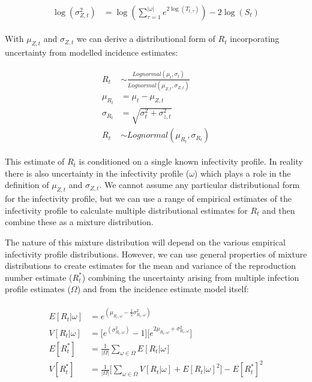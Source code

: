 \documentclass[10pt,letterpaper]{article}
\begin{document}
\begin{eqnarray}
\begin{aligned}
\log(\sigma_{Z,t}^2) &= \log(
	    \sum_{\tau=1}^{|\omega|} {
  	      e^{
  	        2 \log(T_{t,\tau})
  	      }
	    }) - 2 \log(S_{t})
\end{aligned}
\end{eqnarray}


With $\mu_{Z,t}$ and $\sigma_{Z,t}$ we can derive a distributional form of $R_t$ incorporating uncertainty from modelled incidence estimates:

\begin{eqnarray}
\label{eq:final}
\begin{aligned}
R_t &\sim \frac{Lognormal(\mu_t,\sigma_t)}
{Lognormal( \mu_{Z,t}, \sigma_{Z,t})} \\
\mu_{R_t} &= \mu_t - \mu_{Z,t} \\
\sigma_{R_t} &= \sqrt{\sigma_t^2+\sigma_{z,t}^2} \\
R_t &\sim Lognormal(\mu_{R_t}, \sigma_{R_t})
\end{aligned}
\end{eqnarray}

This estimate of $R_t$ is conditioned on a single known infectivity profile. In reality there is also uncertainty in the infectivity profile ($\omega$) which plays a role in the definition of $\mu_{Z,t}$ and $\sigma_{Z,t}$. We cannot assume any particular distributional form for the infectivity profile, but we can use a range of empirical estimates of the infectivity profile to calculate multiple distributional estimates for $R_t$ and then combine these as a mixture distribution.

The nature of this mixture distribution will depend on the various empirical infectivity profile distributions. However, we can use general properties of mixture distributions to create estimates for the mean and variance of the reproduction number estimate ($R_t^*$) combining the uncertainty arising from multiple infection profile estimates ($\Omega$) and from the incidence estimate model itself:

\begin{eqnarray}
\label{eq:final_2}
\begin{aligned}
E[R_t|\omega] &= e^{(\mu_{R_t,\omega} - \frac{1}{2}\sigma_{R_t,\omega}^2)} \\
V[R_t|\omega] &= \big[e^{(\sigma_{R_t,\omega}^2)} - 1\big] \big[e^{2 \mu_{R_t,\omega} + \sigma_{R_t,\omega}^2}\big] \\
E[R_t^*] &= \frac{1}{|\Omega|}\sum_{\omega \in \Omega} E[{R_t|\omega}] \\
V[R_t^*] &= \frac{1}{|\Omega|} \bigg[\sum_{\omega \in \Omega}{V[R_t|\omega]+E[R_t|\omega]^2}\bigg] - E[R_t^*]^2 \\
\end{aligned}
\end{eqnarray}
\end{document}

